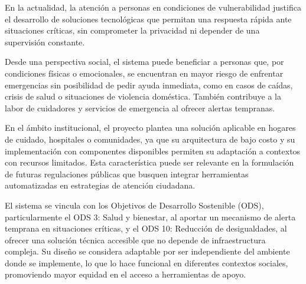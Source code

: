 
En la actualidad, la atención a personas en condiciones de vulnerabilidad justifica el desarrollo de soluciones tecnológicas que permitan una respuesta rápida ante situaciones críticas, sin comprometer la privacidad ni depender de una supervisión constante.




Desde una perspectiva social, el sistema puede beneficiar a personas que, por condiciones físicas o emocionales, se encuentran en mayor riesgo de enfrentar emergencias sin posibilidad de pedir ayuda inmediata, como en casos de caídas, crisis de salud o situaciones de violencia doméstica. También contribuye a la labor de cuidadores y servicios de emergencia al ofrecer alertas tempranas.

En el ámbito institucional, el proyecto plantea una solución aplicable en hogares de cuidado, hospitales o comunidades, ya que su arquitectura de bajo costo y su implementación con componentes disponibles permiten su adaptación a contextos con recursos limitados. Esta característica puede ser relevante en la formulación de futuras regulaciones públicas que busquen integrar herramientas automatizadas en estrategias de atención ciudadana.

El sistema se vincula con los Objetivos de Desarrollo Sostenible (ODS), particularmente el ODS 3: Salud y bienestar, al aportar un mecanismo de alerta temprana en situaciones críticas, y el ODS 10: Reducción de desigualdades, al ofrecer una solución técnica accesible que no depende de infraestructura compleja. Su diseño se considera adaptable por ser independiente del ambiente donde se implemente, lo que lo hace funcional en diferentes contextos sociales, promoviendo mayor equidad en el acceso a herramientas de apoyo.


